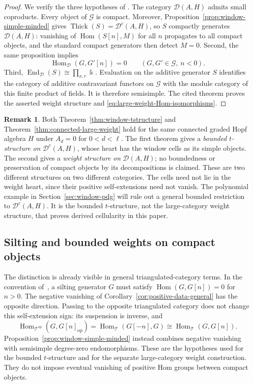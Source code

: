 \documentclass[11pt]{article}
\theoremstyle{definition}
\newtheorem{rem}[thm]{Remark}
\numberwithin{equation}{section}
\newcommand{\kk}{\Bbbk}
\newcommand{\Dc}{\mathcal{D}^c(A,H)}
\newcommand{\Hom}{\operatorname{Hom}}
\newcommand{\End}{\operatorname{End}}
\newcommand{\thick}{\operatorname{Thick}}
\newcommand{\Der}{\mathcal{D}}
\begin{document}
\begin{proof}
We verify the three hypotheses of
\cite[Theorem~4.1]{KeNi}.  The category $\Der(A,H)$ admits
small coproducts.  Every object of $\mathcal G$ is compact.  Moreover,
Proposition~\ref{prop:window-simple-minded} gives
$\thick(S)=\Dc$, so $S$ compactly generates $\Der(A,H)$: vanishing
of $\Hom(S[n],M)$ for all $n$ propagates to all compact objects,
and the standard compact generators then detect $M=0$.
Second, the same proposition implies
\[
 \Hom_{\mathcal D}(G,G'[n])=0
 \qquad(G,G'\in\mathcal G,\ n<0).
\]
Third, $\End_{\mathcal D}(S)\cong\prod_{x,r}\kk$.
Evaluation on the additive generator $S$ identifies the category of
additive contravariant functors on $\mathcal G$ with the module
category of this finite product of fields.  It is therefore
semisimple.  The cited theorem proves the asserted weight structure
and \eqref{eq:large-weight-Hom-isomorphisms}.
\end{proof}

\begin{rem}
\label{rem:connected-two-structures}
Both Theorem~\ref{thm:window-tstructure} and
Theorem~\ref{thm:connected-large-weight} hold for the same
connected graded Hopf algebra $H$ under $A_d=0$ for $0<d<\ell$.
The first theorem gives a \emph{bounded $t$-structure on $\Dc$}, whose
heart has the window cells as its simple objects.  The second gives
a \emph{weight structure on $\Der(A,H)$}; no boundedness or preservation
of compact objects by its decompositions is claimed. These are two different structures on two different categories.
The cells need not lie in the weight heart, since their positive
self-extensions need not vanish.  The polynomial example in
Section~\ref{sec:window-pdg} will rule out a general bounded restriction
to $\Dc$.  It is the bounded $t$-structure, not the large-category weight
structure, that proves derived cellularity in this paper.
\end{rem}

\subsection{Silting and bounded weights on compact objects}
\label{sec:sign-obstruction}
The distinction is already visible in general triangulated-category
terms.  In the convention of~\cite{AiharaIyama}, a silting generator
$G$ must satisfy $\Hom(G,G[n])=0$ for $n>0$.  The negative vanishing of
Corollary~\ref{cor:positive-data-general} has the opposite direction.
Passing to the opposite triangulated category does not change this
self-extension sign: its suspension is inverse, and
\begin{equation}\label{eq:opposite-sign-cancellation}
 \Hom_{\mathcal T^{\mathrm{op}}}(G,G[n]_{\mathrm{op}})
 =\Hom_{\mathcal T}(G[-n],G)
 \cong\Hom_{\mathcal T}(G,G[n]).
\end{equation}
Proposition~\ref{prop:window-simple-minded} instead combines negative
vanishing with semisimple degree-zero endomorphisms.  These are the
hypotheses used for the bounded $t$-structure and for the separate
large-category weight construction.  They do not impose eventual
vanishing of positive Hom groups between compact objects.
\end{document}

